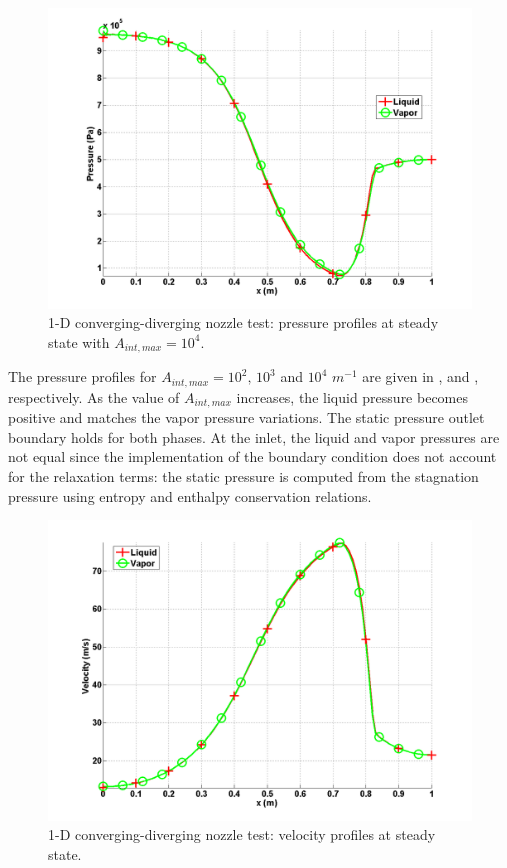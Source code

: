 %
\begin{figure}[H]
\centering
\includegraphics[width=\textwidth]{figures/SEM/Aint1e4_two_phases_pressure.png}
\caption{1-D converging-diverging nozzle test: pressure profiles at steady state with $A_{int,max} = 10^4$.}
\label{fig:two-fluids-rel-nozzle-press-Aint4-sem-sect4}
\end{figure}
%
The pressure profiles for $A_{int,max} = 10^2 \text{, } 10^3$ and $10^4$ $m^{-1}$ are given in ,  and , respectively. As the value of $A_{int,max}$ increases, the liquid pressure becomes positive and matches the vapor pressure variations. The static pressure outlet boundary holds for both phases. At the inlet, the liquid and vapor pressures are not equal since the implementation of the boundary condition does not account for the relaxation terms: the static pressure is computed from the stagnation pressure using entropy and enthalpy conservation relations. 
%
\begin{figure}[H]
\centering
\includegraphics[width=\textwidth]{figures/SEM/Aint1e4_two_phases_velocity.png}
\caption{1-D converging-diverging nozzle test: velocity profiles at steady state.}
\label{fig:two-fluids-rel-nozzle-vel-sem-sect4}
\end{figure}
